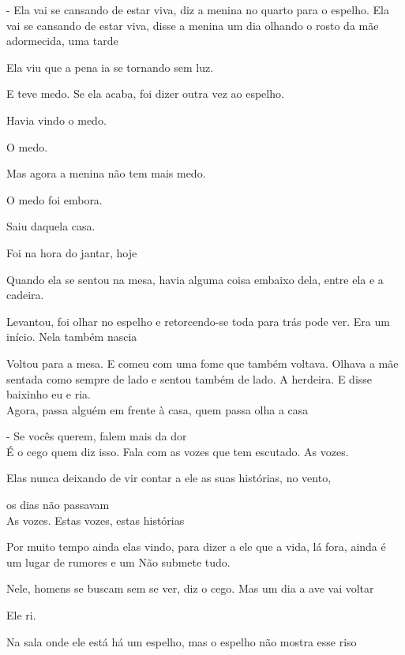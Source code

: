 - Ela vai se cansando de estar viva, diz a menina no quarto para o
espelho. Ela vai se cansando de estar viva, disse a menina um dia
olhando o rosto da mãe adormecida, uma tarde

Ela viu que a pena ia se tornando sem luz.

E teve medo. Se ela acaba, foi dizer outra vez ao espelho.

Havia vindo o medo.

O medo.

Mas agora a menina não tem mais medo.

O medo foi embora.

Saiu daquela casa.

Foi na hora do jantar, hoje

Quando ela se sentou na mesa, havia alguma coisa embaixo dela, entre ela
e a cadeira.

Levantou, foi olhar no espelho e retorcendo-se toda para trás pode ver.
Era um início. Nela também nascia

Voltou para a mesa. E comeu com uma fome que também voltava. Olhava a
mãe sentada como sempre de lado e sentou também de lado. A herdeira. E
disse baixinho eu e ria.\\

Agora, passa alguém em frente à casa, quem passa olha a casa

\pagebreak

- Se vocês querem, falem mais da dor\\

É o cego quem diz isso. Fala com as vozes que tem escutado. As vozes.

Elas nunca deixando de vir contar a ele as suas histórias, no vento,

os dias não passavam\\

As vozes. Estas vozes, estas histórias

Por muito tempo ainda elas vindo, para dizer a ele que a vida, lá fora,
ainda é um lugar de rumores e um Não submete tudo.

Nele, homens se buscam sem se ver, diz o cego. Mas um dia a ave vai
voltar

Ele ri.

Na sala onde ele está há um espelho, mas o espelho não mostra esse riso

\pagebreak

\clearpage
\thispagestyle{empty}

\movetooddpage

